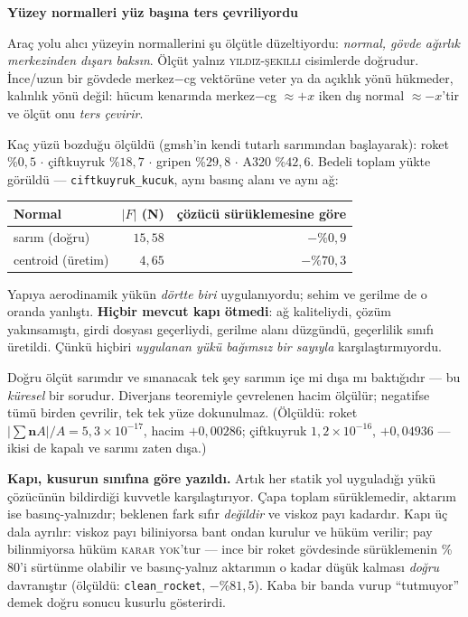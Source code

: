 \documentclass[11pt,a4paper]{article}
\newcommand{\kkkenar}{lacivert}
\newcommand{\kkzemin}{kod}
\newenvironment{renkkutu}[3]{%
  \renewcommand{\kkkenar}{#1}\renewcommand{\kkzemin}{#2}%
  \par\medskip\noindent
  \begin{lrbox}{\kutugovde}%
  \begin{minipage}{\dimexpr\linewidth-2\fboxsep-2\fboxrule\relax}\footnotesize
  \textcolor{#1}{\textbf{#3}}\par\vspace{3pt}%
}{%
  \end{minipage}%
  \end{lrbox}%
  \noindent\fcolorbox{\kkkenar}{\kkzemin}{\usebox{\kutugovde}}%
  \par\medskip
}
\newenvironment{dikkat}[1]{\begin{renkkutu}{orta}{ortabg}{#1}}{\end{renkkutu}}
\begin{document}
\begin{dikkat}{Yüzey normalleri yüz başına ters çevriliyordu}
Araç yolu alıcı yüzeyin normallerini şu ölçütle düzeltiyordu:
\emph{normal, gövde ağırlık merkezinden dışarı baksın}. Ölçüt yalnız
\textsc{yıldız-şekilli} cisimlerde doğrudur. İnce/uzun bir gövdede
merkez$-$cg vektörüne veter ya da açıklık yönü hükmeder, kalınlık yönü
değil: hücum kenarında merkez$-$cg $\approx +x$ iken dış normal
$\approx -x$'tir ve ölçüt onu \emph{ters çevirir}.

\noindent Kaç yüzü bozduğu ölçüldü (gmsh'in kendi tutarlı sarımından
başlayarak): roket \%$0{,}5$ $\cdot$ çiftkuyruk \%$18{,}7$ $\cdot$ gripen
\%$29{,}8$ $\cdot$ A320 \%$42{,}6$. Bedeli toplam yükte görüldü ---
\texttt{ciftkuyruk\_kucuk}, aynı basınç alanı ve aynı ağ:

\begin{center}\footnotesize
\begin{tabular}{@{}lrr@{}}
\toprule
\textbf{Normal} & $|F|$ (N) & \textbf{çözücü sürüklemesine göre} \\
\midrule
sarım (doğru)      & $15{,}58$ & $-\%0{,}9$ \\
centroid (üretim)  & $4{,}65$  & $-\%70{,}3$ \\
\bottomrule
\end{tabular}
\end{center}

\noindent Yapıya aerodinamik yükün \emph{dörtte biri} uygulanıyordu;
sehim ve gerilme de o oranda yanlıştı. \textbf{Hiçbir mevcut kapı
ötmedi}: ağ kaliteliydi, çözüm yakınsamıştı, girdi dosyası geçerliydi,
gerilme alanı düzgündü, geçerlilik sınıfı üretildi. Çünkü hiçbiri
\emph{uygulanan yükü bağımsız bir sayıyla} karşılaştırmıyordu.

Doğru ölçüt sarımdır ve sınanacak tek şey sarımın içe mi dışa mı
baktığıdır --- bu \emph{küresel} bir sorudur. Diverjans teoremiyle
çevrelenen hacim ölçülür; negatifse tümü birden çevrilir, tek tek yüze
dokunulmaz. (Ölçüldü: roket $|\sum \mathbf{n}A|/A = 5{,}3\times10^{-17}$,
hacim $+0{,}00286$; çiftkuyruk $1{,}2\times10^{-16}$, $+0{,}04936$ ---
ikisi de kapalı ve sarımı zaten dışa.)
\end{dikkat}

\noindent \textbf{Kapı, kusurun sınıfına göre yazıldı.} Artık her statik
yol uyguladığı yükü çözücünün bildirdiği kuvvetle karşılaştırıyor.
Çapa toplam sürüklemedir, aktarım ise basınç-yalnızdır; beklenen fark
sıfır \emph{değildir} ve viskoz payı kadardır. Kapı üç dala ayrılır:
viskoz payı biliniyorsa bant ondan kurulur ve hüküm verilir; pay
bilinmiyorsa hüküm \textsc{karar yok}'tur --- ince bir roket gövdesinde
sürüklemenin \%$80$'i sürtünme olabilir ve basınç-yalnız aktarımın o kadar
düşük kalması \emph{doğru} davranıştır (ölçüldü: \texttt{clean\_rocket},
$-\%81{,}5$). Kaba bir banda vurup ``tutmuyor'' demek doğru sonucu kusurlu
gösterirdi.
\end{document}
